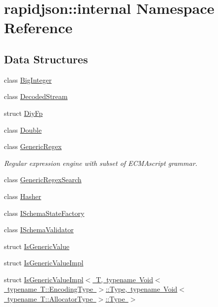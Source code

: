 \hypertarget{namespacerapidjson_1_1internal}{}\section{rapidjson\+::internal Namespace Reference}
\label{namespacerapidjson_1_1internal}
\subsection*{Data Structures}
\begin{DoxyCompactItemize}
\item 
class \mbox{\hyperlink{classrapidjson_1_1internal_1_1_big_integer}{Big\+Integer}}
\item 
class \mbox{\hyperlink{classrapidjson_1_1internal_1_1_decoded_stream}{Decoded\+Stream}}
\item 
struct \mbox{\hyperlink{structrapidjson_1_1internal_1_1_diy_fp}{Diy\+Fp}}
\item 
class \mbox{\hyperlink{classrapidjson_1_1internal_1_1_double}{Double}}
\item 
class \mbox{\hyperlink{classrapidjson_1_1internal_1_1_generic_regex}{Generic\+Regex}}
\begin{DoxyCompactList}\small\item\em Regular expression engine with subset of E\+C\+M\+Ascript grammar. \end{DoxyCompactList}\item 
class \mbox{\hyperlink{classrapidjson_1_1internal_1_1_generic_regex_search}{Generic\+Regex\+Search}}
\item 
class \mbox{\hyperlink{classrapidjson_1_1internal_1_1_hasher}{Hasher}}
\item 
class \mbox{\hyperlink{classrapidjson_1_1internal_1_1_i_schema_state_factory}{I\+Schema\+State\+Factory}}
\item 
class \mbox{\hyperlink{classrapidjson_1_1internal_1_1_i_schema_validator}{I\+Schema\+Validator}}
\item 
struct \mbox{\hyperlink{structrapidjson_1_1internal_1_1_is_generic_value}{Is\+Generic\+Value}}
\item 
struct \mbox{\hyperlink{structrapidjson_1_1internal_1_1_is_generic_value_impl}{Is\+Generic\+Value\+Impl}}
\item 
struct \mbox{\hyperlink{structrapidjson_1_1internal_1_1_is_generic_value_impl_3_01_t_00_01typename_01_void_3_01typename_958d471b859187f8641bd1e7a1585eac}{Is\+Generic\+Value\+Impl$<$ T, typename Void$<$ typename T\+::\+Encoding\+Type $>$\+::\+Type, typename Void$<$ typename T\+::\+Allocator\+Type $>$\+::\+Type $>$}}

\end{DoxyCompactItemize}
